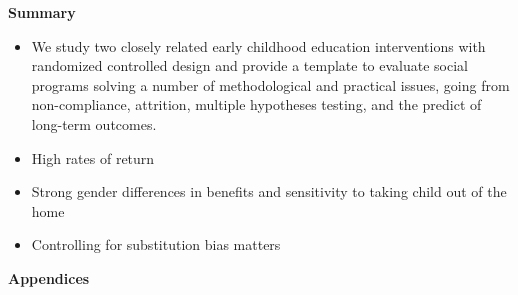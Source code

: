 \documentclass[static]{JJH-Beamer}
\begin{document}
\begin{frame}

\begin{block}{}
\begin{center}
\textbf{Summary}
\end{center}
\end{block}

\end{frame}

\begin{frame}

\begin{itemize}
\item We study two closely related early childhood education interventions with randomized controlled design and provide a template to evaluate social programs solving a number of methodological and practical issues, going from non-compliance, attrition, multiple hypotheses testing, and the predict of long-term outcomes.
\end{itemize}

\end{frame}

\begin{frame}

\begin{itemize}
\item High rates of return
\item Strong gender differences in benefits and sensitivity to taking child out of the home
\item Controlling for substitution bias matters
\end{itemize}

\end{frame}

\clearpage
\begin{frame}

\begin{block}{}
\begin{center}
\textbf{Appendices}
\end{center}
\end{block}

\end{frame}
\end{document}
